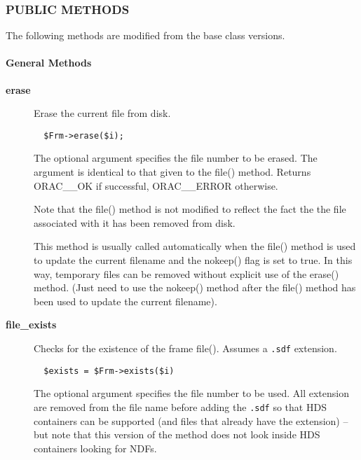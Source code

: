 \subsubsection*{PUBLIC METHODS\label{ORAC::Frame::NDF_PUBLIC_METHODS}}

The following methods are modified from the base class versions.

\paragraph*{General Methods\label{ORAC::Frame::NDF_General_Methods}}\begin{description}
\item[\textbf{erase}] \mbox{}

Erase the current file from disk.

\begin{verbatim}
  $Frm->erase($i);
\end{verbatim}


The optional argument specifies the file number to be erased.
The argument is identical to that given to the file() method.
Returns ORAC\_\_OK if successful, ORAC\_\_ERROR otherwise.



Note that the file() method is not modified to reflect the
fact the the file associated with it has been removed from disk.



This method is usually called automatically when the file()
method is used to update the current filename and the nokeep()
flag is set to true. In this way, temporary files can be removed
without explicit use of the erase() method. (Just need to
use the nokeep() method after the file() method has been used
to update the current filename).

\item[\textbf{file\_exists}] \mbox{}

Checks for the existence of the frame file(). Assumes a \texttt{.sdf}
extension.

\begin{verbatim}
  $exists = $Frm->exists($i)
\end{verbatim}


The optional argument specifies the file number to be used.
All extension are removed from the file name before adding the
\texttt{.sdf} so that HDS containers can be supported (and files
that already have the extension)  -- but note that
this version of the method does not look inside HDS containers
looking for NDFs.


\end{description}
